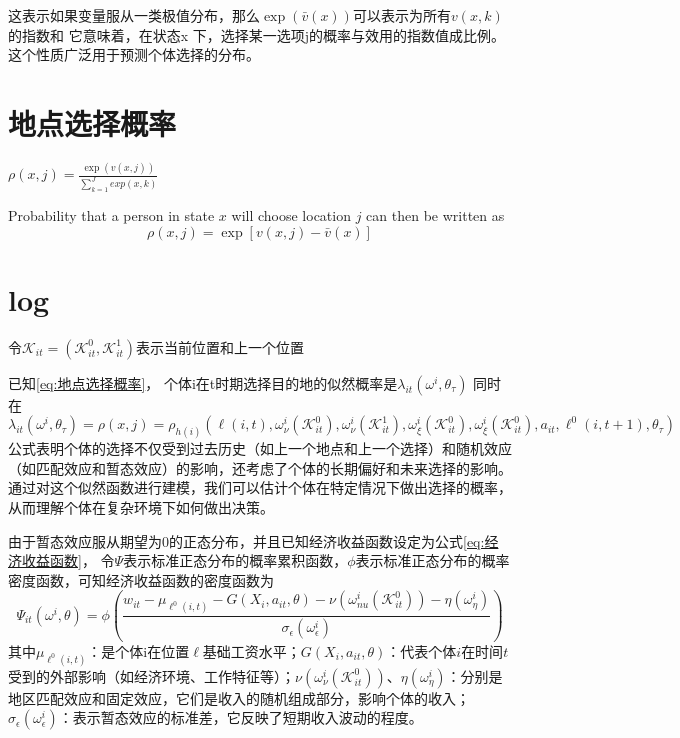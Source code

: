 \documentclass[
  a4paper,
  zihao=-4,
  fontset=mac,
  AutoFakeBold,
  AutoFakeSlant,
  oneside]{ctexbook}
\begin{document}
这表示如果变量服从一类极值分布，那么$\exp\left(\bar{v}(x)\right)$可以表示为所有$v(x, k)$的指数和
它意味着，在状态x 下，选择某一选项j的概率与效用的指数值成比例。
这个性质广泛用于预测个体选择的分布。

\chapter{地点选择概率}
$\rho(x,j)=\frac{\exp(v(x,j))}{\sum\limits_{k=1}^{J} exp(x,k)}$

Probability that a person in state $x$ will choose location $j$ can then be written as
$$\rho(x,j)=\exp[v(x,j)-\bar v(x)]$$

\chapter{log} %

令$\mathcal{K}_{it}=(\mathcal{K}_{it}^{0},\mathcal{K}_{it}^{1})$表示当前位置和上一个位置

已知\ref{eq:地点选择概率}，
个体i在t时期选择目的地的似然概率是$\lambda_{it}(\omega^{i},\theta_{\tau})$
同时在
\begin{equation}
  \lambda_{it}(\omega^{i},\theta_{\tau})=\rho(x,j)=\rho_{h(i)}(\ell(i,t),\omega_{\nu}^{i}(\mathcal{K}_{it}^{0}),\omega_{\nu}^{i}(\mathcal{K}_{it}^{1}),\omega_{\xi}^{i}(\mathcal{K}_{it}^{0}),\omega_{\xi}^{i}(\mathcal{K}_{it}^{0}),a_{it},\ell^{0}(i,t+1),\theta_{\tau})
\end{equation}
公式表明个体的选择不仅受到过去历史（如上一个地点和上一个选择）和随机效应（如匹配效应和暂态效应）的影响，还考虑了个体的长期偏好和未来选择的影响。
通过对这个似然函数进行建模，我们可以估计个体在特定情况下做出选择的概率，从而理解个体在复杂环境下如何做出决策。


由于暂态效应服从期望为$0$的正态分布，并且已知经济收益函数设定为公式\ref{eq:经济收益函数}，
令$\Psi$表示标准正态分布的概率累积函数，$\phi$表示标准正态分布的概率密度函数，可知经济收益函数的密度函数为
\begin{equation}
  \Psi_{it}(\omega^{i},\theta)=\phi(\frac{w_{it} - \mu_{\ell^{0}(i,t)}-G(X_{i},a_{it},\theta)-\nu(\omega_{nu}^{i}(\mathcal{K}_{it}^{0}))-\eta(\omega_{\eta}^{i})  }{\sigma_{\epsilon}(\omega_{\epsilon}^{i})})
\end{equation}
其中$\mu_{\ell^{0}(i,t)}$：是个体i在位置$\ell$基础工资水平；$G(X_i, a_{it}, \theta)$：代表个体$i$在时间$t$受到的外部影响（如经济环境、工作特征等）；$\nu(\omega_{\nu}^i(\mathcal{K}_{it}^0))$、$\eta(\omega_{\eta}^i)$：分别是地区匹配效应和固定效应，它们是收入的随机组成部分，影响个体的收入；$\sigma_{\epsilon}(\omega_{\epsilon}^i)$：表示暂态效应的标准差，它反映了短期收入波动的程度。
\end{document}
